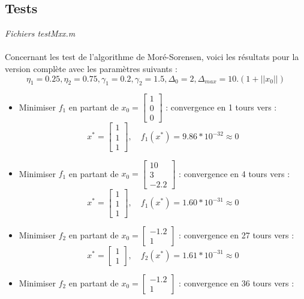 \documentclass[12pt]{article}	%
\begin{document}
\subsection{Tests}
\begin{flushright}
\textit{Fichiers testMxx.m}
\end{flushright}
\paragraph{}
Concernant les test de l'algorithme de Moré-Sorensen, voici les résultats pour la version complète avec les paramètres suivants :
	\[\eta_1 = 0.25, \eta_2 = 0.75, \gamma_1 = 0.2, \gamma_2 = 1.5, \Delta_0 = 2, \Delta_{max} = 10.(1 + ||x_0||)\]
\begin{itemize}
	\item Minimiser $f_1$ en partant de $x_0 = \left[\begin{array}{c}1\\0\\0\end{array}\right]$ : convergence en 1 tours vers :
			\[x^* = \left[\begin{array}{c}1\\1\\1\end{array}\right],\quad f_1(x^*) = 9.86*10^{-32} \approx 0\]
	\item Minimiser $f_1$ en partant de $x_0 = \left[\begin{array}{c}10\\3\\-2.2\end{array}\right]$ : convergence en 4 tours vers :
			\[x^* = \left[\begin{array}{c}1\\1\\1\end{array}\right],\quad f_1(x^*) = 1.60*10^{-31} \approx 0\]
	\item Minimiser $f_2$ en partant de $x_0 = \left[\begin{array}{c}-1.2\\1\end{array}\right]$ : convergence en 27 tours vers :
			\[x^* = \left[\begin{array}{c}1\\1\end{array}\right],\quad f_2(x^*) = 1.61*10^{-31} \approx 0\]
	\item Minimiser $f_2$ en partant de $x_0 = \left[\begin{array}{c}-1.2\\1\end{array}\right]$ : convergence en 36 tours vers :

\end{itemize}
\end{document}
